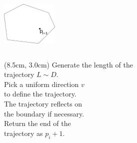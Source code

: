 \documentclass{beamer}
\begin{document}
\begin{frame}
\begin{columns}[t, totalwidth=7cm]
            \includegraphics[width=27mm]{../met_nets/resources/bill6.png}

      \end{columns}

      \begin{textblock*}{8.0cm}(8.5cm, 3.0cm)
         \footnotesize Generate the length of the \\ trajectory $L \sim D$. \\
         \bigbreak
         \footnotesize Pick a uniform direction $v$ \\ to define the trajectory. \\
         \bigbreak
         \footnotesize The trajectory reflects on \\ the boundary if necessary. \\
         \bigbreak
         \footnotesize Return the end of the \\ trajectory as $p_i+1$.
      \end{textblock*}

   
   \end{frame}
\end{document}
